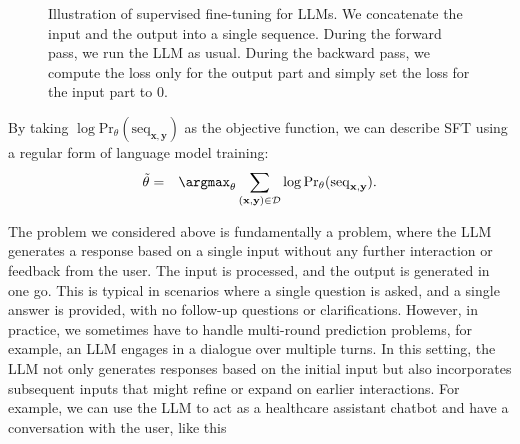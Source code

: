 \begin{figure}[!t]
\centering

\caption{Illustration of supervised fine-tuning for LLMs. We concatenate the input and the output into a single sequence. During the forward pass, we run the LLM as usual. During the backward pass, we compute the loss only for the output part and simply set the loss for the input part to 0.}
\label{fig:sft-forward-backward}
\end{figure}

By taking $\log \mathrm{Pr}_{\theta}(\mathrm{seq}_{\mathbf{x},\mathbf{y}})$ as the objective function, we can describe SFT using a regular form of language model training:
\begin{eqnarray}
\tilde{\theta} & = & \argmax_{\theta} \sum_{(\mathbf{x},\mathbf{y}) \in \mathcal{D}} \log \mathrm{Pr}_{\theta}(\mathrm{seq}_{\mathbf{x},\mathbf{y}}). \label{eq:sft-single-round-prediction-mle}
\end{eqnarray}

The problem we considered above is fundamentally a  problem, where the LLM generates a response based on a single input without any further interaction or feedback from the user. The input is processed, and the output is generated in one go. This is typical in scenarios where a single question is asked, and a single answer is provided, with no follow-up questions or clarifications. However, in practice, we sometimes have to handle multi-round prediction problems, for example, an LLM engages in a dialogue over multiple turns. In this setting, the LLM not only generates responses based on the initial input but also incorporates subsequent inputs that might refine or expand on earlier interactions. For example, we can use the LLM to act as a healthcare assistant chatbot and have a conversation with the user, like this

